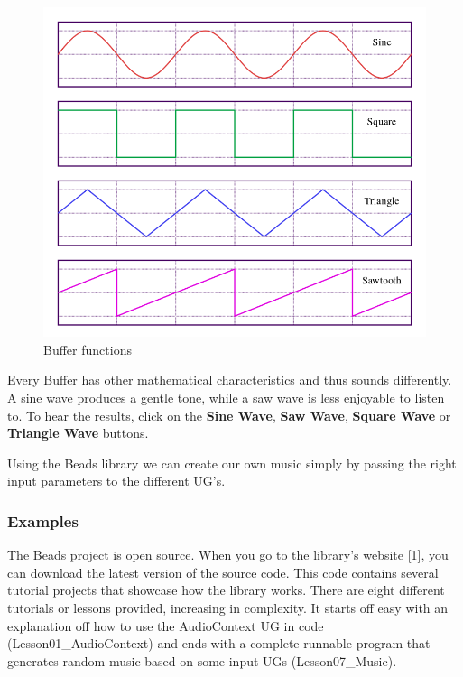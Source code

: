 \documentclass[12pt]{article}
\begin{document}
\begin{figure}[h]
\centering
\includegraphics[scale=0.45]{img/waveForms}
\caption{Buffer functions}
\label{buffers}
\end{figure}

Every Buffer has other mathematical characteristics and thus sounds differently. A sine wave produces a gentle tone, while a saw wave is less enjoyable to listen to. To hear the results, click on the \textbf{Sine Wave}, \textbf{Saw Wave}, \textbf{Square Wave} or \textbf{Triangle Wave} buttons.
\newline

Using the Beads library we can create our own music simply by passing the right input parameters to the different UG's.

\subsubsection{Examples}

The Beads project is open source. When you go to the library's website [1], you can download the latest version of the source code. This code contains several tutorial projects that showcase how the library works. There are eight different tutorials or lessons provided, increasing in complexity. It starts off easy with an explanation off how to use the AudioContext UG in code (Lesson01\_AudioContext) and ends with a complete runnable program that generates random music based on some input UGs (Lesson07\_Music).
\newline
\end{document}
